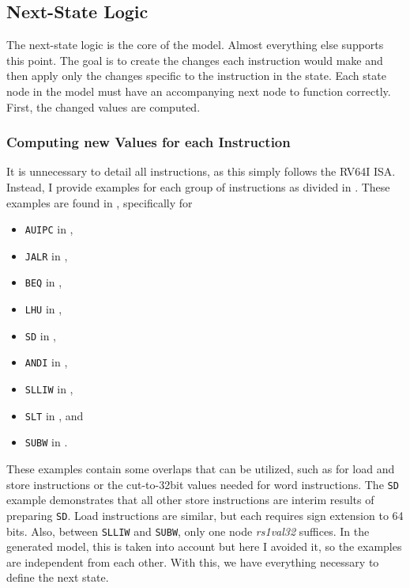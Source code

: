 


\subsection{Next-State Logic}
The next-state logic is the core of the model. Almost everything else
supports this point. The goal is to create the changes each
instruction would make and then apply only the changes specific to
the instruction in the state. Each state node in the model must have
an accompanying next node to function correctly. First, the changed
values are computed.

\subsubsection{Computing new Values for each Instruction}
It is unnecessary to detail all instructions, as this simply follows
the RV64I ISA. Instead, I provide examples for each group of
instructions as divided in . These
examples are found in , specifically for
\begin{itemize}
    \item \texttt{AUIPC} in ,
    \item \texttt{JALR} in ,
    \item \texttt{BEQ} in ,
    \item \texttt{LHU} in ,
    \item \texttt{SD} in ,
    \item \texttt{ANDI} in ,
    \item \texttt{SLLIW} in ,
    \item \texttt{SLT} in , and
    \item \texttt{SUBW} in .
\end{itemize}

These examples contain some overlaps that can be utilized, such as
for load and store instructions or the cut-to-32bit values needed for
word instructions. The \texttt{SD} example demonstrates that all
other store instructions are interim results of preparing
\texttt{SD}. Load instructions are similar, but each requires sign
extension to 64 bits. Also, between \texttt{SLLIW} and \texttt{SUBW},
only one node \textsl{rs1val32} suffices. In the generated model,
this is taken into account but here I avoided it, so the examples are
independent from each other. With this, we have everything necessary
to define the next state.

